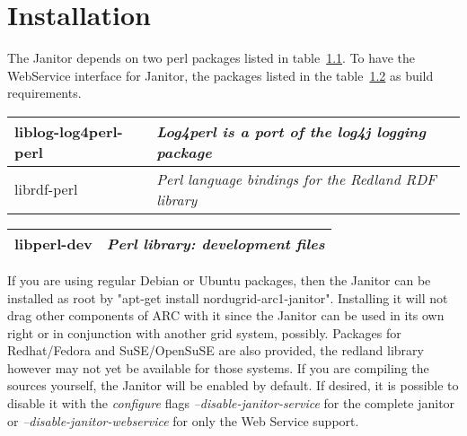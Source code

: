 \chapter{Installation} 




The Janitor depends on two perl packages listed in table~\ref{tab:install_dependencies}. To have the WebService interface for Janitor,
the packages listed in the table~\ref{tab:install_dependencies_optional} as build requirements.
\begin{table}[!h]
   \begin{center}
        \label{tab:install_dependencies}
	\begin{tabular}{|p{3cm}|p{7cm}|}
	\hline
	   liblog-log4perl-perl & \textit{Log4perl is a port of the log4j logging package}\\
	\hline
	   librdf-perl          & \textit{Perl language bindings for the Redland RDF library}\\
	\hline
	\end{tabular} 
   \end{center}
\end{table}
\begin{table}[!h]
   \begin{center}
        \label{tab:install_dependencies_optional}
	\begin{tabular}{|p{3cm}|p{7cm}|}
	\hline
	   libperl-dev & \textit{ Perl library: development files}\\
	\hline
	\end{tabular}
   \end{center}
\end{table}
\forcelinebreak


If you are using regular Debian or Ubuntu packages, then the Janitor
can be installed as root by "apt-get install nordugrid-arc1-janitor".
Installing it will not drag other components of ARC with it since the
Janitor can be used in its own right or in conjunction with another
grid system, possibly. Packages for Redhat/Fedora and SuSE/OpenSuSE are
also provided, the redland library however may not yet be available for
those systems.  If you are compiling the sources yourself, the Janitor
will be enabled by default. If desired, it is possible to disable it
with the \textit{configure} flags \textit{--disable-janitor-service}
for the complete janitor or \textit{--disable-janitor-webservice} for
only the Web Service support.

